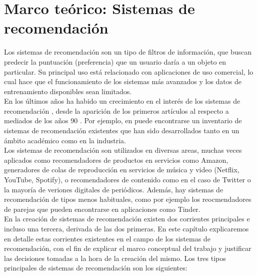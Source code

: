 \chapter{Marco teórico: Sistemas de recomendación}\label{chap:recom}

Los sistemas de recomendación son un tipo de filtros de información, que buscan predecir la puntuación (preferencia) que un usuario daría a un objeto en particular. Su principal uso está relacionado con aplicaciones de uso comercial, lo cual hace que el funcionamiento de los sistemas más avanzados y los datos de entrenamiento disponibles sean limitados.\\

En los últimos años ha habido un crecimiento en el interés de los sistemas de recomendación \cite{Abdomavicius}, desde la aparición de los primeros artículos al respecto a mediados de los años 90 \cite{resnick}. Por ejemplo, en \cite{nageswara} puede encontrarse un inventario de sistemas de recomendación existentes que han sido desarrollados tanto en un ámbito académico como en la industria.\\

Los sistemas de recomendación son utilizados en diversas areas, muchas veces aplicados como recomendadores de productos en servicios como Amazon, generadores de colas de reproducción en servicios de música y video (Netflix, YouTube, Spotify), o recomendadores de contenido como en el caso de Twitter o la mayoría de veriones digitales de periódicos. Además, hay sistemas de recomendación de tipos menos habituales, como por ejemplo los reocmendadores de parejas que pueden encontrarse en aplicaciones como Tinder.\\

En la creación de sistemas de recomendación existen dos corrientes principales e incluso una tercera, derivada de las dos primeras. En este capítulo explicaremos en detalle estas corrientes existentes en el campo de los sistemas de recomendación, con el fin de explicar el marco conceptual del trabajo y justificar las decisiones tomadas a la hora de la creación del mismo. Los tres tipos principales de sistemas de recomendación son los siguientes:

